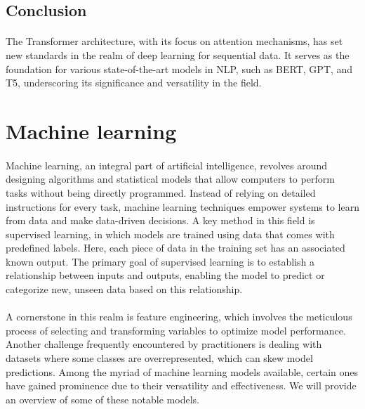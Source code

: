         \subsection{Conclusion}
        
            \paragraph{}The Transformer architecture, with its focus on attention mechanisms, has set new standards in the realm of deep learning for sequential data. It serves as the foundation for various state-of-the-art models in NLP, such as BERT, GPT, and T5, underscoring its significance and versatility in the field.
        

\section{Machine learning}\label{seq:background:machine_learning}
    \paragraph{}Machine learning, an integral part of artificial intelligence, revolves around designing algorithms and statistical models that allow computers to perform tasks without being directly programmed. Instead of relying on detailed instructions for every task, machine learning techniques empower systems to learn from data and make data-driven decisions. A key method in this field is supervised learning, in which models are trained using data that comes with predefined labels. Here, each piece of data in the training set has an associated known output. The primary goal of supervised learning is to establish a relationship between inputs and outputs, enabling the model to predict or categorize new, unseen data based on this relationship.

    \paragraph{}A cornerstone in this realm is feature engineering, which involves the meticulous process of selecting and transforming variables to optimize model performance. Another challenge frequently encountered by practitioners is dealing with datasets where some classes are overrepresented, which can skew model predictions. Among the myriad of machine learning models available, certain ones have gained prominence due to their versatility and effectiveness. We will provide an overview of some of these notable models.

